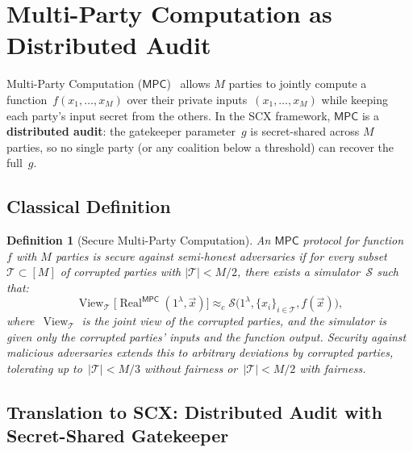 \documentclass[12pt,a4paper]{article}
\newtheorem{definition}[theorem]{Definition}
\theoremstyle{remark}
\newcommand{\T}{\mathcal{T}}
\newcommand{\SCX}{\textsf{SCX}}
\newcommand{\MPC}{\textsf{MPC}}
\newcommand{\Sim}{\mathcal{S}}
\DeclareMathOperator{\View}{View}
\DeclareMathOperator{\Real}{Real}
\begin{document}
\section{Multi-Party Computation as Distributed Audit}
\label{sec:mpc}

Multi-Party Computation ($\MPC$)~\cite{yao1982protocols,goldreich1987play} allows $M$ parties to jointly compute a function~$f(x_1, \ldots, x_M)$ over their private inputs~$(x_1, \ldots, x_M)$ while keeping each party's input secret from the others. In the \SCX{} framework, $\MPC$ is a \textbf{distributed audit}: the gatekeeper parameter~$g$ is secret-shared across $M$ parties, so no single party (or any coalition below a threshold) can recover the full~$g$.

\subsection{Classical Definition}

\begin{definition}[Secure Multi-Party Computation]
\label{def:mpc}
An $\MPC$ protocol for function~$f$ with $M$ parties is secure against semi-honest adversaries if for every subset~$\T \subset [M]$ of corrupted parties with $|\T| < M/2$, there exists a simulator~$\Sim$ such that:
\begin{equation}
  \View_{\T}\big[\Real^{\MPC}(1^\lambda, \vec{x})\big] \approx_c \Sim\big(1^\lambda, \{x_i\}_{i \in \T}, f(\vec{x})\big),
\end{equation}
where~$\View_{\T}$ is the joint view of the corrupted parties, and the simulator is given only the corrupted parties' inputs and the function output. Security against malicious adversaries extends this to arbitrary deviations by corrupted parties, tolerating up to~$|\T| < M/3$ without fairness or~$|\T| < M/2$ with fairness.
\end{definition}

\subsection{Translation to SCX: Distributed Audit with Secret-Shared Gatekeeper}
\end{document}
